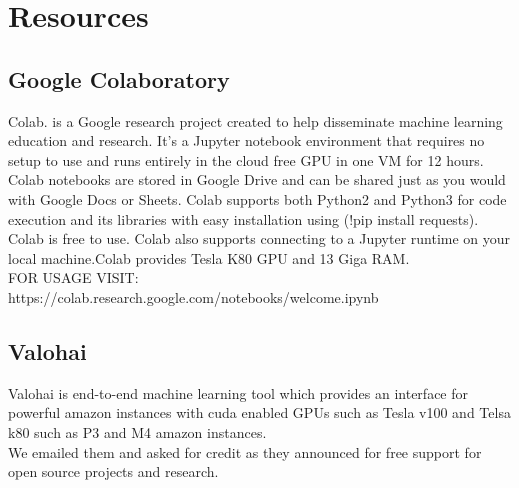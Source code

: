 \section{Resources}
\label{chap:Resources}

\subsection{Google Colaboratory}
Colab. is a Google research project created to help disseminate machine learning education and research. It's a Jupyter notebook environment that requires no setup to use and runs entirely in the cloud free GPU in one VM for 12 hours. Colab notebooks are stored in Google Drive and can be shared just as you would with Google Docs or Sheets. Colab supports both Python2 and Python3 for code execution and its libraries with easy installation using (!pip install requests). Colab is free to use. Colab also supports connecting to a Jupyter runtime on your local machine.Colab provides Tesla K80 GPU and 13 Giga RAM.\\FOR USAGE VISIT: https://colab.research.google.com/notebooks/welcome.ipynb
\subsection{Valohai}
Valohai is end-to-end machine learning tool which provides an interface for powerful amazon instances with cuda enabled GPUs such as Tesla v100 and Telsa k80 such as P3 and M4 amazon instances. \\
We emailed them and asked for credit as they announced for free support for open source projects and research.
